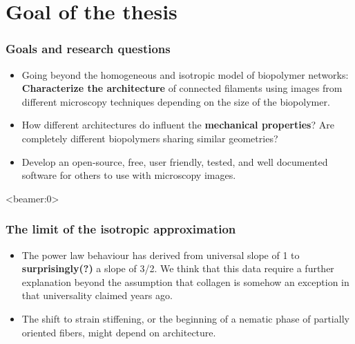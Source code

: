 \documentclass[9pt]{beamer}
\begin{document}
\section{Goal of the thesis}
\begin{frame}
  \frametitle{Goals and research questions}
  \begin{exampleblock}{}
  \begin{itemize}
    \item<1-> Going beyond the homogeneous and isotropic model of biopolymer networks: \textbf{Characterize the architecture} of connected filaments using images from different microscopy techniques depending on the size of the biopolymer.
    \item<2-> How different architectures do influent the \textbf{mechanical properties}? Are completely different biopolymers sharing similar geometries?
    \item<3-> Develop an open-source, free, user friendly, tested, and well documented software for others to use with microscopy images.
  \end{itemize}
  \end{exampleblock}
\end{frame}
\begin{frame}<beamer:0>
  \frametitle{The limit of the isotropic approximation}
  \begin{itemize}
    \item The power law behaviour has derived from universal slope of 1 \cite{mackintosh_bill} to \textbf{surprisingly(?)} a slope of  3/2. We think that this data require a further explanation beyond the assumption that collagen is somehow an exception in that universality claimed years ago.
    \item The shift to strain stiffening, or the beginning of a nematic phase of partially oriented fibers, might depend on architecture.
  \end{itemize}
\end{frame}
%
\end{document}
